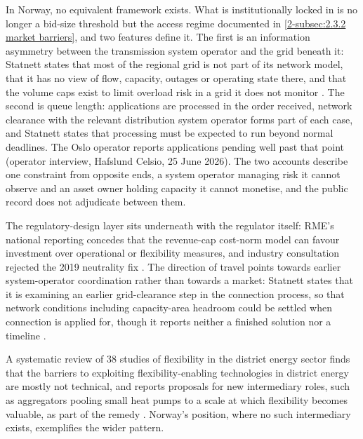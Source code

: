 In Norway, no equivalent framework exists. What is institutionally locked in is no longer a bid-size threshold but the access regime documented in \autoref{2-subsec:2.3.2 market barriers}, and two features define it. The first is an information asymmetry between the transmission system operator and the grid beneath it: Statnett states that most of the regional grid is not part of its network model, that it has no view of flow, capacity, outages or operating state there, and that the volume caps exist to limit overload risk in a grid it does not monitor \cite{statnett_innforing_2026}. The second is queue length: applications are processed in the order received, network clearance with the relevant distribution system operator forms part of each case, and Statnett states that processing must be expected to run beyond normal deadlines. The Oslo operator reports applications pending well past that point (operator interview, Hafslund Celsio, 25 June 2026). The two accounts describe one constraint from opposite ends, a system operator managing risk it cannot observe and an asset owner holding capacity it cannot monetise, and the public record does not adjudicate between them.

The regulatory-design layer sits underneath with the regulator itself: RME's national reporting concedes that the revenue-cap cost-norm model can favour investment over operational or flexibility measures, and industry consultation rejected the 2019 neutrality fix \cite{ove_flataker_national_2020}. The direction of travel points towards earlier system-operator coordination rather than towards a market: Statnett states that it is examining an earlier grid-clearance step in the connection process, so that network conditions including capacity-area headroom could be settled when connection is applied for, though it reports neither a finished solution nor a timeline \cite{statnett_innforing_2026, statnett_sporsmal_2026}.

A systematic review of 38 studies of flexibility in the district energy sector finds that the barriers to exploiting flexibility-enabling technologies in district energy are mostly not technical, and reports proposals for new intermediary roles, such as aggregators pooling small heat pumps to a scale at which flexibility becomes valuable, as part of the remedy \cite{selvakkumaran_how_2021}. Norway's position, where no such intermediary exists, exemplifies the wider pattern.

